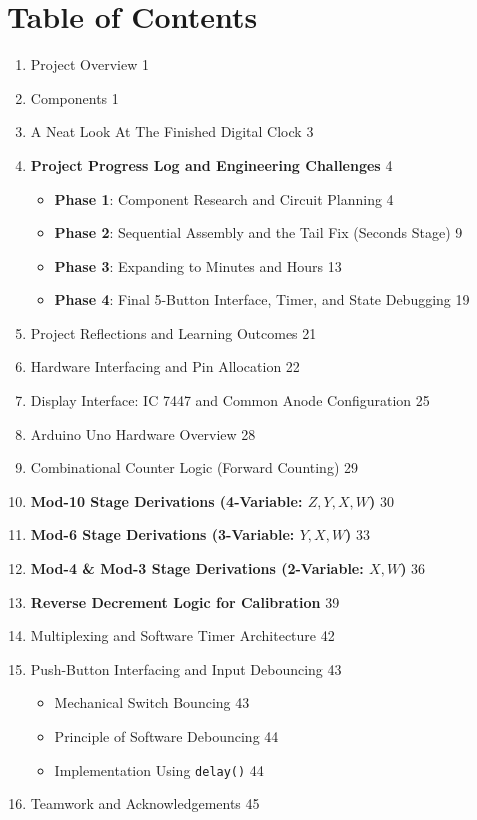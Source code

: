 \documentclass[journal,12pt,onecolumn]{IEEEtran}
\begin{document}
	
\section*{Table of Contents}


\vspace{1cm}

\begin{enumerate}
	
	\setlength{\itemsep}{1.1em} 
	
	\item Project Overview \hfill 1
	\item Components \hfill 1
	\item A Neat Look At The Finished Digital Clock \hfill 3
	\item \textbf{Project Progress Log and Engineering Challenges} \hfill 4
	\begin{itemize}
		
		\setlength{\itemsep}{0.8em} 
		
		\item \textbf{Phase 1}: Component Research and Circuit Planning \hfill 4
		\item \textbf{Phase 2}: Sequential Assembly and the Tail Fix (Seconds Stage) \hfill 9
		\item \textbf{Phase 3}: Expanding to Minutes and Hours \hfill 13
		\item \textbf{Phase 4}: Final 5-Button Interface, Timer, and State Debugging \hfill 19
	\end{itemize}
	\item Project Reflections and Learning Outcomes \hfill 21
	\item Hardware Interfacing and Pin Allocation \hfill 22
	\item Display Interface: IC 7447 and Common Anode Configuration \hfill 25
	\item Arduino Uno Hardware Overview \hfill 28
	\item Combinational Counter Logic (Forward Counting) \hfill 29
	\item \textbf{Mod-10 Stage Derivations (4-Variable: $Z, Y, X, W$)} \hfill 30
	\item \textbf{Mod-6 Stage Derivations (3-Variable: $Y, X, W$)} \hfill 33
	\item \textbf{Mod-4 \& Mod-3 Stage Derivations (2-Variable: $X, W$)} \hfill 36
	\item \textbf{Reverse Decrement Logic for Calibration} \hfill 39
	\item Multiplexing and Software Timer Architecture \hfill 42
	\item Push-Button Interfacing and Input Debouncing \hfill 43
	\begin{itemize}
		\setlength{\itemsep}{0.8em}
		\item Mechanical Switch Bouncing \hfill 43
		\item Principle of Software Debouncing \hfill 44
		\item Implementation Using \texttt{delay()} \hfill 44
	\end{itemize}
	\item Teamwork and Acknowledgements \hfill 45
\end{enumerate}
\end{document}

